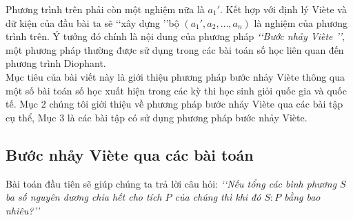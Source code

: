 Phương trình trên phải còn một nghiệm nữa là $a_1'.$ Kết hợp với định lý Viète và dữ kiện của đầu bài ta sẽ \lq\lq xây dựng \rq\rq bộ $(a_1',a_2,\ldots,a_n)$ là nghiệm của phương trình trên. Ý tưởng đó chính là nội dung của phương pháp \textit{\lq\lq Bước nhảy Viète \rq\rq}, một phương pháp thường được sử dụng trong các bài toán số học liên quan đến phương trình Diophant.\\
Mục tiêu của bài viết này là giới thiệu phương pháp bước nhảy Viète thông qua một số bài toán số học xuất hiện trong các kỳ thi học sinh giỏi quốc gia và quốc tế. Mục 2 chúng tôi giới thiệu về phương pháp bước nhảy Viète qua các bài tập cụ thể, Mục 3 là các bài tập có sử dụng phương pháp bước nhảy Viète.
\subsection{Bước nhảy Viète qua các bài toán}
Bài toán đầu tiên sẽ giúp chúng ta trả lời câu hỏi: \textit{\lq\lq Nếu tổng các bình phương $S$ ba số nguyên dương chia hết cho tích $P$ của chúng thì khi đó $S:P$ bằng bao nhiêu?\rq\rq}
